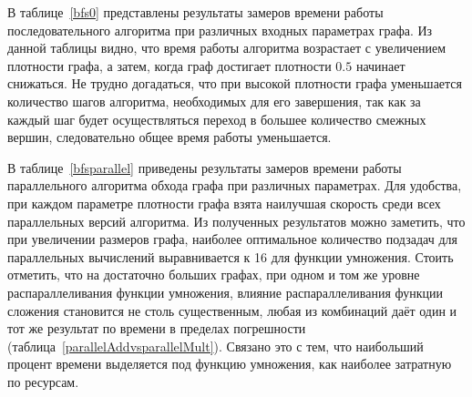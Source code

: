 В таблице~\ref{bfs0} представлены результаты замеров времени работы последовательного алгоритма при различных входных параметрах графа. Из данной таблицы видно, что время работы алгоритма возрастает с увеличением плотности графа, а затем, когда граф достигает плотности $0.5$ начинает снижаться. Не трудно догадаться, что при высокой плотности графа уменьшается количество шагов алгоритма, необходимых для его завершения, так как за каждый шаг будет осуществляться переход в большее количество смежных вершин, следовательно общее время работы уменьшается.

\begin{table}[h]
\centering
    \caption{Производительность последовательного алгоритма обхода графов в ширину.}
    \label{bfs0}
\end{table}

В таблице~\ref{bfsparallel} приведены результаты замеров времени работы параллельного алгоритма обхода графа при различных параметрах. Для удобства, при каждом параметре плотности графа взята наилучшая скорость среди всех параллельных версий алгоритма. Из полученных результатов можно заметить, что при увеличении размеров графа, наиболее оптимальное количество подзадач для параллельных вычислений выравнивается к 16 для функции умножения. Стоить отметить, что на достаточно больших графах, при одном и том же уровне распараллеливания функции умножения, влияние распараллеливания функции сложения становится не столь существенным, любая из комбинаций даёт один и тот же результат по времени в пределах погрешности (таблица~\ref{parallelAddvsparallelMult}). Связано это с тем, что наибольший процент времени выделяется под функцию умножения, как наиболее затратную по ресурсам.

